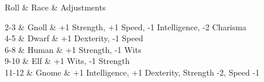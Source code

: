 \documentclass[titlepage,a4paper,openany]{book}
\begin{document}
\newcommand{\racechart}{

\begin{tcolorbox}[tabularx={cll},arc=1mm,adjusted title=Race]

	Roll & Race & Adjustments \\\hline

	2-3 & Gnoll & +1 Strength, +1 Speed, -1 Intelligence, -2 Charisma \\

	4-5 & Dwarf & +1 Dexterity, -1 Speed \\

	6-8 & Human & +1 Strength, -1 Wits \\

	9-10 & Elf & +1 Wits, -1 Strength \\

	11-12 & Gnome & +1 Intelligence, +1 Dexterity, Strength -2, Speed -1 \\

\end{tcolorbox}
}

\racechart
\end{document}

